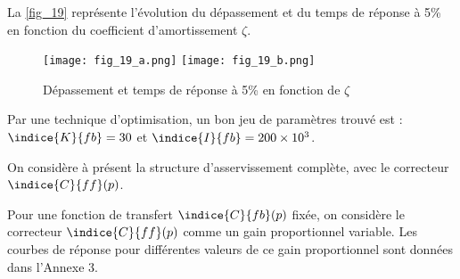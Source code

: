 \ifprof
\begin{corrige}
\end{corrige}
\else
\fi

La \autoref{fig_19} représente l'évolution du dépassement et du temps de réponse à 5\% en fonction du
coefficient d'amortissement $\zeta$.

\ifprof
\begin{corrige}
\end{corrige}
\else
\fi

\begin{figure}[H]
\centering
\texttt{[image: fig\_19\_a.png]}
\texttt{[image: fig\_19\_b.png]}
\caption{Dépassement et temps de réponse à 5\% en fonction de $\zeta$ \label{fig_19}}
\end{figure}




Par une technique d’optimisation, un bon jeu de paramètres trouvé est : $\indice{K}{fb}=30$ et $\indice{I}{fb}=200\times10^{3}$.

\ifprof
\begin{corrige}
\end{corrige}
\else
\fi

\ifprof
\begin{corrige}
\end{corrige}
\else
\fi


On considère à présent la structure d'asservissement complète, avec le correcteur $\indice{C}{ff} (p)$.

\ifprof
\begin{corrige}
\end{corrige}
\else
\fi

\ifprof
\begin{corrige}
\end{corrige}
\else
\fi

Pour une fonction de transfert $\indice{C}{fb} (p)$ fixée, on considère le correcteur $\indice{C}{ff}(p)$ comme un gain
proportionnel variable. Les courbes de réponse pour différentes valeurs de ce gain proportionnel
sont données dans l'Annexe 3.

\ifprof
\begin{corrige}
\end{corrige}
\else
\fi

